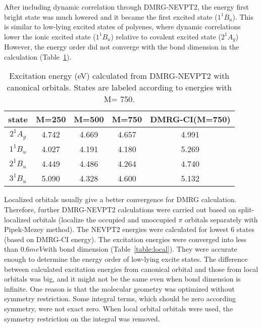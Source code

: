 After including dynamic correlation through DMRG-NEVPT2, the energy first bright state was much lowered and it became the first excited state ($1^1B_u$). 
This is similar to low-lying excited states of polyenes, where dynamic correlations lower the ionic excited state ($1^1B_u$) relative to covalent excited state ($2^1A_g$)
However, the energy order did not converge with the bond dimension in the calculation (Table~\ref{table:canonical}).


\begin{table}
   \caption{Excitation energy (eV) calculated from DMRG-NEVPT2 with canonical orbitals. States are labeled according to energies with M= 750. }
  \label{table:canonical}
\begin{tabular}{ccccc}
\hline
  state & M=250 & M=500 & M=750 & DMRG-CI(M=750)\\
\hline
  $2^1A_g$ & 4.742 &  4.669  &   4.657   &   4.991 \\
  $1^1B_u$ & 4.027 &  4.191  &   4.180   &   5.269 \\
  $2^1B_u$ & 4.449 &  4.486  &   4.264   &   4.740 \\
  $3^1B_u$ & 5.090 &  4.328  &   4.600   &   5.132 \\
\hline
\end{tabular}
\end{table}

Localized orbitals usually give a better convergence for DMRG calculation.\cite{olivares-amaya_ab-initio_2015} Therefore, further DMRG-NEVPT2 calculations were carried out based on split-localized orbitals (localize the occupied and unoccupied $\pi$ orbitals separately with Pipek-Mezey method\cite{pipek_fast_1989}). 
The NEVPT2 energies were calculated for lowest 6 states (based on DMRG-CI energy). The excitation energies were converged into less than $0.6 meV$with bond dimension (Table~\ref{table:local}). They were accurate enough to determine the energy order of low-lying excite states. 
The difference between calculated excitation energies from canonical orbital and those from local orbitals was big, and it might not be the same even when bond dimension is infinite. One reason is that the molecular geometry was optimized without symmetry restriction. Some integral terms, which should be zero according symmetry, were not exact zero. When local orbital orbitals were used, the symmetry restriction on the integral was removed. 


